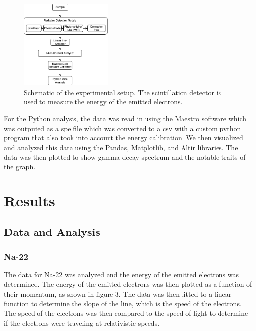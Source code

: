 \documentclass[12pt]{article}
\begin{document}
                        \begin{figure}[htb!]
                                \centering
                                \includegraphics[width=0.4\textwidth]{./img/other/Lab2 Apparatus.drawio.png}
                                \caption{Schematic of the experimental setup. The scintillation detector is used to measure the energy of the emitted electrons.}
                                \label{fig:Schematic of the experimental setup. The scintillation detector is used to measure the energy of the emitted electrons.}
                        \end{figure}

                        For the Python analysis, the data was read in using the Maestro software which was outputed as a 
                        spe file which was converted to a csv with a custom python program that also took into account 
                        the energy calibration. We then visualized and analyzed this data using the Pandas, Matplotlib, and Altir libraries. 
                        The data was then plotted to show gamma decay spectrum and the notable traits of the graph.



\section{Results}
        \subsection{Data and Analysis}

                \subsubsection{Na-22}
                The data for Na-22 was analyzed and the energy of the emitted electrons was determined. 
                The energy of the emitted electrons was then plotted as a function of their momentum, 
                as shown in figure 3. The data was then fitted to a linear function to determine the slope 
                of the line, which is the speed of the electrons. The speed of the electrons was then compared 
                to the speed of light to determine if the electrons were traveling at relativistic speeds.
\end{document}
